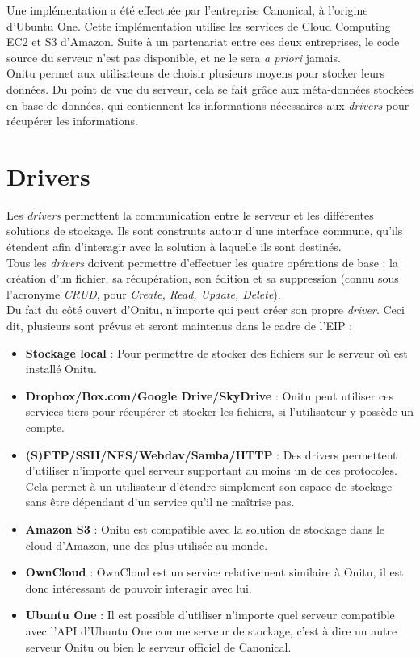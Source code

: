 Une implémentation a été effectuée par l'entreprise Canonical, à l'origine d'Ubuntu One. Cette implémentation utilise les services de Cloud Computing EC2 et S3 d'Amazon. Suite à un partenariat entre ces deux entreprises, le code source du serveur n'est pas disponible, et ne le sera \textit{a priori} jamais.\\

Onitu permet aux utilisateurs de choisir plusieurs moyens pour stocker leurs données. Du point de vue du serveur, cela se fait grâce aux méta-données stockées en base de données, qui contiennent les informations nécessaires aux \textit{drivers} pour récupérer les informations.\\

\section{Drivers}
Les \textit{drivers} permettent la communication entre le serveur et les différentes solutions de stockage. Ils sont construits autour d'une interface commune, qu'ils étendent afin d'interagir avec la solution à laquelle ils sont destinés.\\

Tous les \textit{drivers} doivent permettre d'effectuer les quatre opérations de base : la création d'un fichier, sa récupération, son édition et sa suppression (connu sous l'acronyme \textit{CRUD}, pour \textit{Create, Read, Update, Delete}).\\

Du fait du côté ouvert d'Onitu, n'importe qui peut créer son propre \textit{driver}. Ceci dit, plusieurs sont prévus et seront maintenus dans le cadre de l'EIP :
\begin{itemize}
\renewcommand{\labelitemi}{$\bullet$}
    \item \textbf{Stockage local} : Pour permettre de stocker des fichiers sur le serveur où est installé Onitu.
    \item \textbf{Dropbox/Box.com/Google Drive/SkyDrive} : Onitu peut utiliser ces services tiers pour récupérer et stocker les fichiers, si l'utilisateur y possède un compte.
    \item \textbf{(S)FTP/SSH/NFS/Webdav/Samba/HTTP} : Des drivers permettent d'utiliser n'importe quel serveur supportant au moins un de ces protocoles. Cela permet à un utilisateur d'étendre simplement son espace de stockage sans être dépendant d'un service qu'il ne maîtrise pas.
    \item \textbf{Amazon S3} : Onitu est compatible avec la solution de stockage dans le cloud d'Amazon, une des plus utilisée au monde.
    \item \textbf{OwnCloud} : OwnCloud est un service relativement similaire à Onitu, il est donc intéressant de pouvoir interagir avec lui.
    \item \textbf{Ubuntu One} : Il est possible d'utiliser n'importe quel serveur compatible avec l'API d'Ubuntu One comme serveur de stockage, c'est à dire un autre serveur Onitu ou bien le serveur officiel de Canonical.
\end{itemize}

